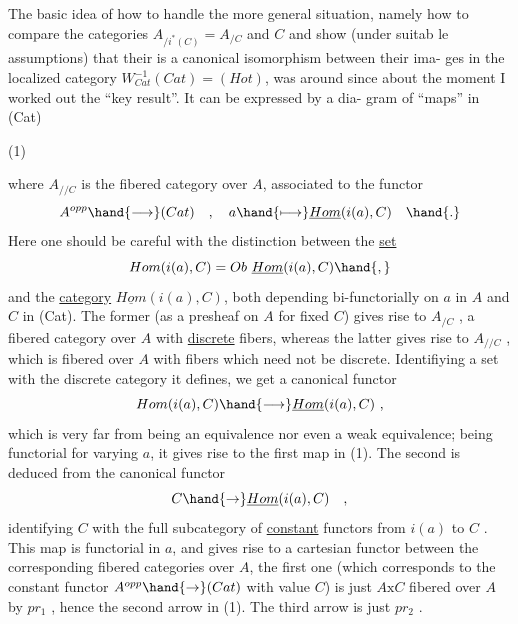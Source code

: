 
The basic idea of how to handle the more general situation,  namely
how to compare the categories $A_{/i^{*}(C)} = A_{/C}$ and $C$\hand{,} and show (under suitab%
le assumptions)  that their is a canonical isomorphism between their ima-%
ges in the localized category $W_{Cat}^{-1}(Cat) = (Hot)$,  was around since about
the moment I worked out the ``key result''.  It can be expressed by a dia-%
gram of ``maps'' in (Cat)

(1) 

where $A_{//C}$ is the fibered category over $A$,  associated to the functor
\[ A^{opp} \hand{\longrightarrow} (Cat) \quad , \quad a \hand{\longmapsto} \underline{Hom}(i(a),C) \quad \hand{.} \]
Here one should be careful with the distinction  between the \uline{set}
\[ Hom(i(a),C) = Ob\ \underline{Hom}(i(a),C)\hand{,} \]
and the \uline{category} $\underline{Hom}(i(a),C)$,  both depending bi-functorially on $a$ in $A$
and $C$ in (Cat).  The former (as a presheaf on $A$ for fixed $C$)  gives rise
to $A_{/C}$ ,  a fibered category over $A$ with \uline{discrete} fibers,  whereas the
latter gives rise to $A_{//C}$ ,  which is fibered over $A$ with fibers which
need not be discrete.  Identifiying a set with the discrete category it
defines,  we get a canonical functor
\[ Hom(i(a),C) \hand{\longrightarrow} \underline{Hom}(i(a),C) \ , \]
which is very far from being an equivalence nor even a weak equivalence;
being functorial for varying $a$,  it gives rise to the first map in (1).
The second is deduced from the canonical functor
\[ C \hand{\rightarrow} \underline{Hom}(i(a),C) \quad , \]
identifying $C$ with the full subcategory of \uline{constant} functors from $i(a)$ to
$C$ .  This map is functorial in $a$,  and gives rise  to a cartesian functor
between the corresponding fibered categories over $A$,  the first one
(which corresponds to the constant functor $A^{opp}\hand{\rightarrow}(Cat)$ with value $C$) is
just $A\mathrm{x}C$ fibered over $A$ by $pr_{1}$ ,  hence the second arrow in (1).  The
third arrow is just $pr_{2}$ .

